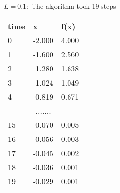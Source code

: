 \documentclass{article}
\begin{document}
        \textbf{$L = 0.1:$} The algorithm took 19 steps    
    \begin{table}[]
        \begin{tabular}{|lll|ll}
        \cline{1-3}
        \multicolumn{1}{|l|}{\textbf{time}} & \multicolumn{1}{l|}{\textbf{x}} & \textbf{f(x)} &  &  \\ \cline{1-3}
        \multicolumn{1}{|l|}{0}             & \multicolumn{1}{l|}{-2.000}     & 4.000         &  &  \\ \cline{1-3}
        \multicolumn{1}{|l|}{1}             & \multicolumn{1}{l|}{-1.600}     & 2.560         &  &  \\ \cline{1-3}
        \multicolumn{1}{|l|}{2}             & \multicolumn{1}{l|}{-1.280}     & 1.638         &  &  \\ \cline{1-3}
        \multicolumn{1}{|l|}{3}             & \multicolumn{1}{l|}{-1.024}     & 1.049         &  &  \\ \cline{1-3}
        \multicolumn{1}{|l|}{4}             & \multicolumn{1}{l|}{-0.819}     & 0.671         &  &  \\ \cline{1-3}
        \multicolumn{3}{|c|}{.......}                                                         &  &  \\ \cline{1-3}
        \multicolumn{1}{|l|}{15}            & \multicolumn{1}{l|}{-0.070}     & 0.005         &  &  \\ \cline{1-3}
        \multicolumn{1}{|l|}{16}            & \multicolumn{1}{l|}{-0.056}     & 0.003         &  &  \\ \cline{1-3}
        \multicolumn{1}{|l|}{17}            & \multicolumn{1}{l|}{-0.045}     & 0.002         &  &  \\ \cline{1-3}
        \multicolumn{1}{|l|}{18}            & \multicolumn{1}{l|}{-0.036}     & 0.001         &  &  \\ \cline{1-3}
        \multicolumn{1}{|l|}{19}            & \multicolumn{1}{l|}{-0.029}     & 0.001         &  &  \\ \cline{1-3}
        \end{tabular}
        \end{table}
\end{document}
